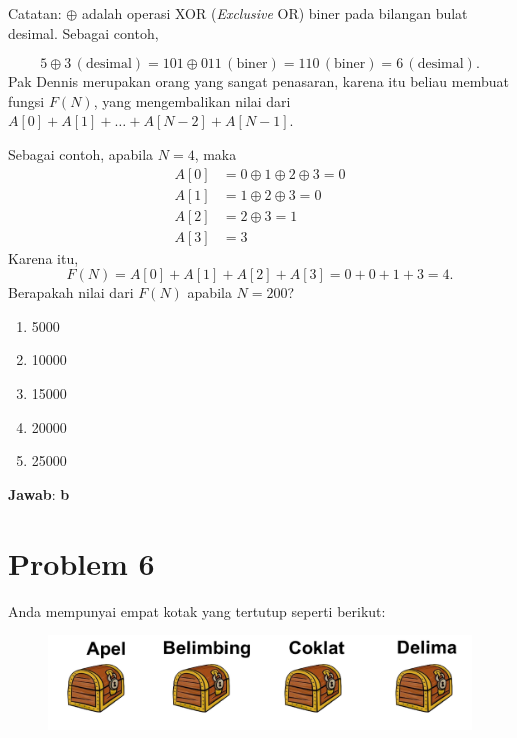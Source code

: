 \documentclass{article}
\theoremstyle{plain}
\begin{document}
\bigskip
\noindent Catatan: $\oplus$ adalah operasi XOR (\textit{Exclusive} OR) biner pada bilangan bulat desimal. Sebagai contoh,

\begin{equation*}
5 \oplus 3 \, (\text{desimal}) = 101 \oplus 011 \, (\text{biner}) = 110 \, (\text{biner}) = 6 \, (\text{desimal}). 
\end{equation*}
Pak Dennis merupakan orang yang sangat penasaran, karena itu beliau membuat fungsi $F(N)$, yang mengembalikan nilai dari $A[0] + A[1] + \ldots + A[N - 2] + A[N - 1]$. 

\bigskip
\noindent Sebagai contoh, apabila $N=4$, maka
\begin{align*}
A[0] &= 0 \oplus 1 \oplus 2 \oplus 3 = 0 \\
A[1] &= 1 \oplus 2 \oplus 3 = 0 \\
A[2] &= 2 \oplus 3 = 1 \\
A[3] &= 3 
\end{align*}
Karena itu,
\begin{equation*}
	F(N) = A[0] + A[1] + A[2] + A[3] = 0 + 0 + 1 + 3 = 4.
\end{equation*}
Berapakah nilai dari $F(N)$ apabila $N=200$?

	\begin{enumerate}[-,topsep=0pt, nosep,label=\alph*. ]
		\item 5000
		\item 10000
		\item 15000
		\item 20000
		\item 25000
	\end{enumerate}

\bigskip
\noindent \textbf{Jawab}: \textbf{b}

\newpage
\section*{Problem 6}
Anda mempunyai empat kotak yang tertutup seperti berikut:

\begin{figure}[!ht]
	\centering
	\includegraphics[scale=.25]{images/soal-nomor-9}
\end{figure}
\end{document}

